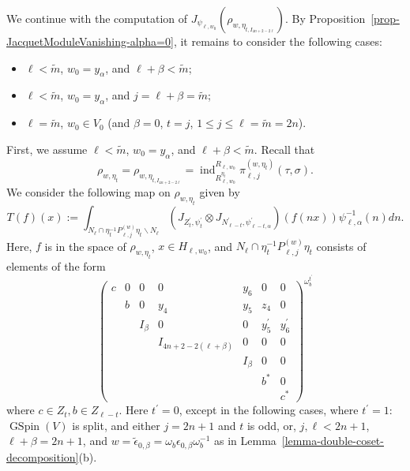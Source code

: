 \documentclass[12pt]{amsart}
\newcommand{\ind}{\operatorname{ind}}
\newcommand{\wt}{\widetilde}
\theoremstyle{remark}
\DeclareMathOperator{\GSpin}{GSpin}
\begin{document}
We continue with the computation of $J_{\psi_{\ell, w_0}}(\rho_{w,\eta_{t,I_{4n+2-2\ell}}})$. By Proposition~\ref{prop-JacquetModuleVanishing-alpha=0}, it remains to consider the following cases:
\begin{itemize}
\item $\ell<\wt m$, $w_0=y_\alpha$, and $\ell+\beta<\wt m$;
\item $\ell<\wt m$, $w_0=y_\alpha$, and $j=\ell+\beta=\wt m$;
\item $\ell=\wt m$, $w_0\in V_0$ (and $\beta=0$, $t=j$, $1\le j\le \ell=\wt m=2n$).
\end{itemize}


First, we assume $\ell<\wt m$, $w_0=y_\alpha$, and $\ell+\beta<\wt m$. Recall that   
\begin{equation*}
\rho_{w,\eta_t}=\rho_{w,\eta_{t,I_{4n+2-2\ell}}}=\ind_{R_{\ell,w_0}^{\eta_t}}^{R_{\ell,w_0}} \pi_{\ell,j}^{(w,\eta_t)}(\tau,\sigma).
\end{equation*}
We consider the following map on $\rho_{w,\eta_t}$ given by
\begin{equation}
\label{eq-iso-T-1}
T(f)(x):=\int_{N_{\ell}\cap \eta_t^{-1} P_{\ell,j}^{(w)}\eta_t \backslash N_{\ell} } \left( J_{Z_t^\prime,\psi_t^\prime}\otimes J_{N_{\ell-t}^\prime, \psi_{\ell-t,\alpha} ^\prime} \right) (f(nx)) \psi_{\ell,\alpha}^{-1}(n)dn.
\end{equation}
Here, $f$ is in the space of $\rho_{w,\eta_t}$, $x\in H_{\ell,w_0}$, and $N_{\ell}\cap \eta_t^{-1} P_{\ell,j}^{(w)}\eta_t$ consists of elements of the form
\begin{equation}
\label{eq-N-ell-sub1}
	  \begin{pmatrix}
c & 0 & 0&0&y_6 &0 &0\\	
&b&0&y_4&y_5 &z_4&0\\ 
&&I_{\beta} &0 &0 &y_5^\prime &y_6^\prime\\
&&&I_{4n+2-2(\ell+\beta)} & 0 &0&0\\
&&&&I_\beta &0&0\\
&&&&&b^* &0\\
&&&&&&c^* 
\end{pmatrix}^{\omega_b^{t^\prime}}  
\end{equation}
where $c\in Z_t, b\in Z_{\ell-t}$. 
Here $t^\prime=0$, except in the following cases, where $t^\prime=1$: $\GSpin(V)$ is split, and either $j=2n+1$ and $t$ is odd, or, $j, \ell<2n+1$, $\ell+\beta=2n+1$, and $w=\widetilde \epsilon_{0,\beta}=\omega_b  {\epsilon}_{0, \beta}  \omega_b^{-1}$ as in Lemma~\ref{lemma-double-coset-decomposition}(b). 
\end{document}
